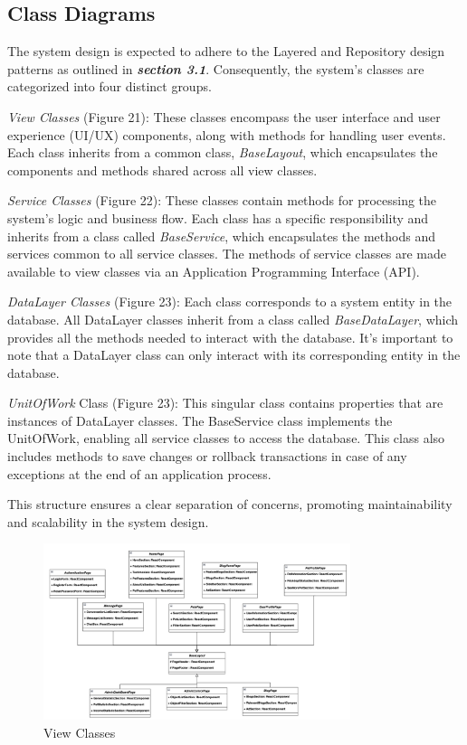 \subsection{Class Diagrams}

The system design is expected to adhere to the Layered and Repository
design patterns as outlined in \emph{\textbf{section 3.1}}.
Consequently, the system's classes are categorized into four distinct
groups.

\emph{View Classes} (Figure 21): These classes encompass the user
interface and user experience (UI/UX) components, along with methods for
handling user events. Each class inherits from a common class,
\emph{BaseLayout}, which encapsulates the components and methods shared
across all view classes.

\emph{Service Classes} (Figure 22): These classes contain methods for
processing the system's logic and business flow. Each class has a
specific responsibility and inherits from a class called
\emph{BaseService}, which encapsulates the methods and services common
to all service classes. The methods of service classes are made
available to view classes via an Application Programming Interface
(API).

\emph{DataLayer Classes} (Figure 23): Each class corresponds to a system
entity in the database. All DataLayer classes inherit from a class
called \emph{BaseDataLayer}, which provides all the methods needed to
interact with the database. It's important to note that a DataLayer
class can only interact with its corresponding entity in the database.

\emph{UnitOfWork} Class (Figure 23): This singular class contains
properties that are instances of DataLayer classes. The BaseService
class implements the UnitOfWork, enabling all service classes to access
the database. This class also includes methods to save changes or
rollback transactions in case of any exceptions at the end of an
application process.

This structure ensures a clear separation of concerns, promoting
maintainability and scalability in the system design.

\begin{figure}[H]
  \centering
  \includegraphics[angle=-90,width=0.8\textwidth]{Figures/view_class.png}
  \caption{View Classes}
  \label{fig:view-classes}
\end{figure}
\clearpage

